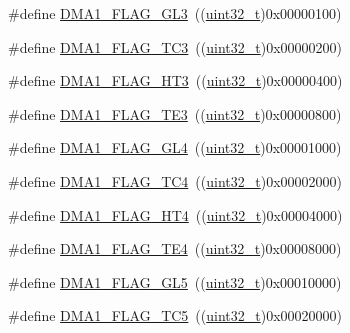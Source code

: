 \begin{DoxyCompactItemize}
\item 
\#define \hyperlink{group___d_m_a__flags__definition_gaf3eccffb15e5b64611774b22f8b43e91}{D\+M\+A1\+\_\+\+F\+L\+A\+G\+\_\+\+G\+L3}~((\hyperlink{_p_e___types_8h_a33594304e786b158f3fb30289278f5af}{uint32\+\_\+t})0x00000100)
\item 
\#define \hyperlink{group___d_m_a__flags__definition_ga0490d6c6fca12f4bcc61ef69e3fbdd93}{D\+M\+A1\+\_\+\+F\+L\+A\+G\+\_\+\+T\+C3}~((\hyperlink{_p_e___types_8h_a33594304e786b158f3fb30289278f5af}{uint32\+\_\+t})0x00000200)
\item 
\#define \hyperlink{group___d_m_a__flags__definition_ga9c801c1702fcc41b74bb7397ce80a8fc}{D\+M\+A1\+\_\+\+F\+L\+A\+G\+\_\+\+H\+T3}~((\hyperlink{_p_e___types_8h_a33594304e786b158f3fb30289278f5af}{uint32\+\_\+t})0x00000400)
\item 
\#define \hyperlink{group___d_m_a__flags__definition_gaa0b3d86f09829d0388273f0cd51698cc}{D\+M\+A1\+\_\+\+F\+L\+A\+G\+\_\+\+T\+E3}~((\hyperlink{_p_e___types_8h_a33594304e786b158f3fb30289278f5af}{uint32\+\_\+t})0x00000800)
\item 
\#define \hyperlink{group___d_m_a__flags__definition_gace751c9c8aa57b154d61865625cca25b}{D\+M\+A1\+\_\+\+F\+L\+A\+G\+\_\+\+G\+L4}~((\hyperlink{_p_e___types_8h_a33594304e786b158f3fb30289278f5af}{uint32\+\_\+t})0x00001000)
\item 
\#define \hyperlink{group___d_m_a__flags__definition_ga78f2798eca161493d5dc6058f65b0f17}{D\+M\+A1\+\_\+\+F\+L\+A\+G\+\_\+\+T\+C4}~((\hyperlink{_p_e___types_8h_a33594304e786b158f3fb30289278f5af}{uint32\+\_\+t})0x00002000)
\item 
\#define \hyperlink{group___d_m_a__flags__definition_ga12ad5a2c8cd9778fecf88d1dab7626d4}{D\+M\+A1\+\_\+\+F\+L\+A\+G\+\_\+\+H\+T4}~((\hyperlink{_p_e___types_8h_a33594304e786b158f3fb30289278f5af}{uint32\+\_\+t})0x00004000)
\item 
\#define \hyperlink{group___d_m_a__flags__definition_ga53beafec27ed89735e83fc7577a00d39}{D\+M\+A1\+\_\+\+F\+L\+A\+G\+\_\+\+T\+E4}~((\hyperlink{_p_e___types_8h_a33594304e786b158f3fb30289278f5af}{uint32\+\_\+t})0x00008000)
\item 
\#define \hyperlink{group___d_m_a__flags__definition_ga173d8dadcbf3d96911a43eedf53bd64e}{D\+M\+A1\+\_\+\+F\+L\+A\+G\+\_\+\+G\+L5}~((\hyperlink{_p_e___types_8h_a33594304e786b158f3fb30289278f5af}{uint32\+\_\+t})0x00010000)
\item 
\#define \hyperlink{group___d_m_a__flags__definition_ga438d3577b5b5b6c2c0cf1008296c23bb}{D\+M\+A1\+\_\+\+F\+L\+A\+G\+\_\+\+T\+C5}~((\hyperlink{_p_e___types_8h_a33594304e786b158f3fb30289278f5af}{uint32\+\_\+t})0x00020000)

\end{DoxyCompactItemize}
